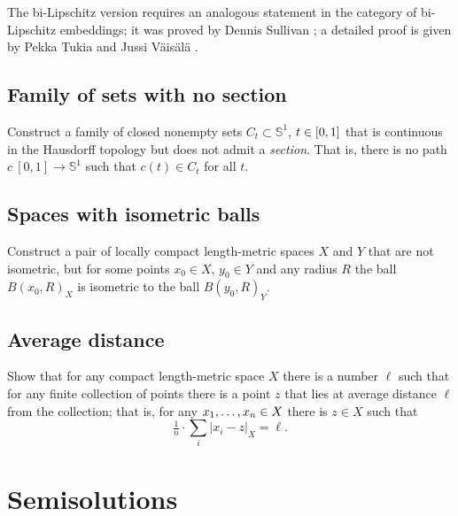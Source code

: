 The bi-Lipschitz version requires an analogous statement in the category of bi-Lipschitz embeddings;
it was proved by Dennis Sullivan \cite{sullivan};
a detailed proof is given by Pekka Tukia and Jussi Väisälä \cite[][3.6]{tukia-vaisala}.

\subsection*{Family of sets with no section\easy}
\label{hausdorff-section} 

\begin{pr}
Construct a family of closed nonempty sets $C_t\subset\mathbb{S}^1$, $t\z\in [0,1]$ that is continuous in the Hausdorff topology but does not admit a {}\emph{section}.
That is, there is no path $c\:[0,1]\to \mathbb{S}^1$ such that $c(t)\in C_t$ for all $t$.
\end{pr}

\subsection*{Spaces with isometric balls}

\begin{pr}
Construct a pair of locally compact length-metric spaces $X$ and $Y$ that are not isometric, but for some points $x_0\in X$, $y_0\in Y$ and any radius $R$ the ball $B(x_0,R)_X$ is isometric to the ball $B(y_0,R)_Y$.
\end{pr}

\subsection*{Average distance\easy}

\begin{pr}
Show that for any compact length-metric space $X$ there is a number $\ell$ such that for any finite collection of points there is a point $z$ that lies at average distance $\ell$ from the collection;
that is, for any $x_1,\ldots,x_n\z\in X$ there is $z\in X$ such that
\[\tfrac1n\cdot\sum_i|x_i-z|_{X}=\ell.\]

\end{pr}

\section*{Semisolutions}

